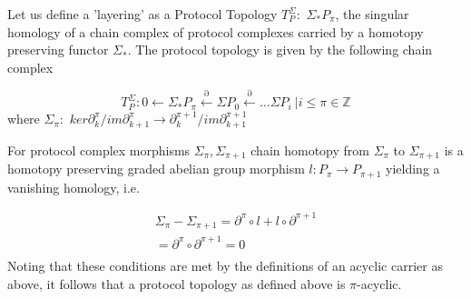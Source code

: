 \documentclass[runningheads]{llncs}
\begin{document}
Let us define a 'layering' as a Protocol Topology $T^{\Sigma}_P: $ $\Sigma_{*}P_\pi$, the singular homology of a chain complex of protocol complexes carried by a homotopy preserving functor $\Sigma_*$. The protocol topology is given by the following chain complex

\begin{equation}
T^{\Sigma}_P: 0 \leftarrow \Sigma_{*}P_\pi \xleftarrow{\partial} \Sigma P_{0} \xleftarrow{\partial} \dots \Sigma P_i \ | i \leq \pi \in \mathbb{Z}
\end{equation}
where $\Sigma_\pi: $ $ker \partial^{\pi}_{k}/im \partial^{\pi}_{k+1} \rightarrow \partial^{\pi+1}_{k} /im \partial^{\pi+1}_{k+1}$ 

For protocol complex morphisms $\Sigma_\pi, \Sigma_{\pi+1}$ chain homotopy from $\Sigma_\pi$ to $\Sigma_{\pi+1}$ is a homotopy preserving graded abelian group morphism $l: P_{\pi} \rightarrow P_{\pi+1}$ yielding a vanishing homology, i.e. 

\begin{equation}
\begin{split}
\Sigma_\pi - \Sigma_{\pi+1} =  \partial^{\pi}\circ l + l \circ \partial^{\pi+1} \\
= \partial^\pi \circ \partial^{\pi+1} = 0 \\
\end{split}
\end{equation}
Noting that these conditions are met by the definitions of an acyclic carrier as above, it follows that a protocol topology as defined above is $\pi$-acyclic.
 
\end{document}
